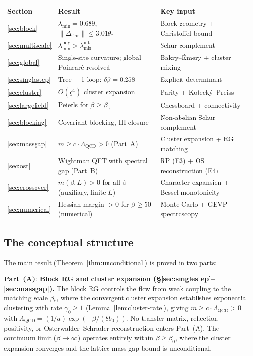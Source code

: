 \documentclass[11pt]{article}
\theoremstyle{definition}
\newcommand{\Lam}{\Lambda_{\mathrm{QCD}}}
\begin{document}
\begin{center}
\begin{tabular}{lll}
\toprule
\textbf{Section} & \textbf{Result} & \textbf{Key input}\\
\midrule
\ref{sec:block} & $\lambda_{\min}=0.689$, $\|\Delta_{\mathrm{Chr}}\|\le 3.01\theta_*$ &
Block geometry + Christoffel bound\\
\ref{sec:multiscale} & $\lambda_{\min}^{\mathrm{bdy}}>
\lambda_{\min}^{\mathrm{int}}$ & Schur complement\\
\ref{sec:global} & Single-site curvature; global Poincar\'e resolved & Bakry--\'Emery + cluster mixing\\
\ref{sec:singlestep} & Tree + 1-loop: $\delta\beta=0.258$ &
Explicit determinant\\
\ref{sec:cluster} & $O(g^4)$ cluster expansion & Parity +
Koteck\'y--Preiss\\
\ref{sec:largefield} & Peierls for $\beta\ge\beta_0$ & Chessboard +
connectivity\\
\ref{sec:blocking} & Covariant blocking, IH closure &
Non-abelian Schur complement\\
\ref{sec:massgap} & $m\ge c\cdot\Lam>0$ (Part~A) &
Cluster expansion + RG matching\\
\ref{sec:ost} & Wightman QFT with spectral gap (Part~B) &
RP (E3) + OS reconstruction (E4)\\
\ref{sec:crossover} & $m(\beta,L)>0$ for all $\beta$ (auxiliary, finite $L$) &
Character expansion + Bessel monotonicity\\
\ref{sec:numerical} & Hessian margin $>0$ for $\beta\ge 50$ (numerical) &
Monte Carlo + GEVP spectroscopy\\
\bottomrule
\end{tabular}
\end{center}

\subsection{The conceptual structure}

The main result (Theorem~\ref{thm:unconditional}) is proved in two
parts:

\medskip\noindent\textbf{Part~(A): Block RG and cluster expansion
(\S\ref{sec:singlestep}--\ref{sec:massgap}).}
The block RG controls the flow from weak coupling
to the matching scale $\beta_*$, where the convergent cluster
expansion establishes exponential
clustering with rate $\gamma_0\ge 1$ (Lemma~\ref{lem:cluster-rate}),
giving
$m\ge c\cdot\Lam>0$ with $\Lam=(1/a)\exp(-\beta/(8b_0))$.
No transfer matrix, reflection positivity, or
Osterwalder--Schrader reconstruction enters Part~(A).
The continuum limit ($\beta\to\infty$) operates entirely
within $\beta\ge\beta_0$, where the cluster expansion converges
and the lattice mass gap bound is unconditional.
\end{document}
